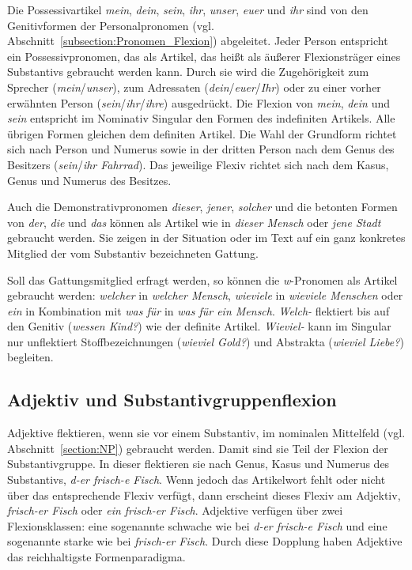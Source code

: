 Die Possessivartikel \textit{mein}, \textit{dein}, \textit{sein}, \textit{ihr}, \textit{unser}, \textit{euer} und \textit{ihr} sind von den Genitivformen der Personalpronomen (vgl. Abschnitt~\ref{subsection:Pronomen_Flexion}) abgeleitet. Jeder Person entspricht ein Possessivpronomen, das als Artikel, das heißt als äußerer Flexionsträger eines Substantivs gebraucht werden kann. Durch sie wird die Zugehörigkeit zum Sprecher (\textit{mein}/\textit{unser}), zum Adressaten (\textit{dein}/\textit{euer}/\textit{Ihr}) oder zu einer vorher erwähnten Person (\textit{sein}/\textit{ihr}/\textit{ihre}) ausgedrückt. Die Flexion von \textit{mein}, \textit{dein} und \textit{sein} entspricht im Nominativ Singular den Formen des indefiniten Artikels. Alle übrigen Formen gleichen dem definiten Artikel. Die Wahl der Grundform richtet sich nach Person und Numerus sowie in der dritten Person nach dem Genus des Besitzers (\textit{sein}/\textit{ihr Fahrrad}). Das jeweilige Flexiv richtet sich nach dem Kasus, Genus und Numerus des Besitzes.

Auch die Demonstrativpronomen \textit{dieser}, \textit{jener}, \textit{solcher} und die betonten Formen von \textit{der}, \textit{die} und \textit{das} können als Artikel wie in \textit{dieser Mensch} oder \textit{jene Stadt} gebraucht werden. Sie zeigen in der Situation oder im Text auf ein ganz konkretes Mitglied der vom Substantiv bezeichneten Gattung. 

Soll das Gattungsmitglied erfragt werden, so können die \textit{w}-Pronomen als Artikel gebraucht werden: \textit{welcher} in \textit{welcher Mensch}, \textit{wieviele} in \textit{wieviele Menschen} oder \textit{ein} in Kombination mit \textit{was für} in \textit{was für ein Mensch}. \textit{Welch-} flektiert bis auf den Genitiv (\textit{wessen Kind?}) wie der definite Artikel. \textit{Wieviel-} kann im Singular nur unflektiert Stoffbezeichnungen (\textit{wieviel Gold?}) und Abstrakta (\textit{wieviel Liebe?}) begleiten.  


\subsection{Adjektiv und Substantivgruppenflexion}\label{subsection:Adjektiv_SGr_Flexion}

Adjektive flektieren, wenn sie vor einem Substantiv, im nominalen Mittelfeld (vgl. Abschnitt~\ref{section:NP}) gebraucht werden. Damit sind sie Teil der Flexion der Substantivgruppe. In dieser flektieren sie nach Genus, Kasus und Numerus des Substantivs, \zB \textit{d-er frisch-e Fisch}. Wenn jedoch das Artikelwort fehlt oder nicht über das entsprechende Flexiv verfügt, dann erscheint dieses Flexiv am Adjektiv, \zB \textit{frisch-er Fisch} oder \textit{ein frisch-er Fisch}. Adjektive verfügen über zwei Flexionsklassen: eine sogenannte schwache wie bei \textit{d-er frisch-e Fisch} und eine sogenannte starke wie bei \textit{frisch-er Fisch}. Durch diese Dopplung haben Adjektive das reichhaltigste Formenparadigma. 

